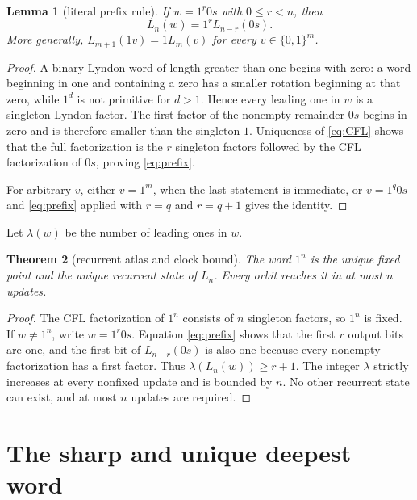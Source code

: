 \documentclass[10pt,a4paper]{amsart}
\newtheorem{theorem}{Theorem}[section]
\newtheorem{lemma}[theorem]{Lemma}
\theoremstyle{definition}
\theoremstyle{remark}
\begin{document}
\begin{lemma}[literal prefix rule]\label{lem:prefix}
If $w=1^r0s$ with $0\le r<n$, then
\begin{equation}\label{eq:prefix}
 L_n(w)=1^r L_{n-r}(0s).
\end{equation}
More generally, $L_{m+1}(1v)=1L_m(v)$ for every $v\in\{0,1\}^m$.
\end{lemma}

\begin{proof}
A binary Lyndon word of length greater than one begins with zero: a word
beginning in one and containing a zero has a smaller rotation beginning at
that zero, while $1^d$ is not primitive for $d>1$.  Hence every leading one
in $w$ is a singleton Lyndon factor.  The first factor of the nonempty
remainder $0s$ begins in zero and is therefore smaller than the singleton
$1$.  Uniqueness of \eqref{eq:CFL} shows that the full factorization is the
$r$ singleton factors followed by the CFL factorization of $0s$, proving
\eqref{eq:prefix}.

For arbitrary $v$, either $v=1^m$, when the last statement is immediate, or
$v=1^q0s$ and \eqref{eq:prefix} applied with $r=q$ and $r=q+1$ gives the
identity.
\end{proof}

Let $\lambda(w)$ be the number of leading ones in $w$.

\begin{theorem}[recurrent atlas and clock bound]\label{thm:atlas}
The word $1^n$ is the unique fixed point and the unique recurrent state of
$L_n$.  Every orbit reaches it in at most $n$ updates.
\end{theorem}

\begin{proof}
The CFL factorization of $1^n$ consists of $n$ singleton factors, so $1^n$ is
fixed.  If $w\ne1^n$, write $w=1^r0s$.  Equation \eqref{eq:prefix} shows that
the first $r$ output bits are one, and the first bit of
$L_{n-r}(0s)$ is also one because every nonempty factorization has a first
factor.  Thus $\lambda(L_n(w))\ge r+1$.  The integer $\lambda$ strictly
increases at every nonfixed update and is bounded by $n$.  No other recurrent
state can exist, and at most $n$ updates are required.
\end{proof}

\section{The sharp and unique deepest word}
\end{document}
